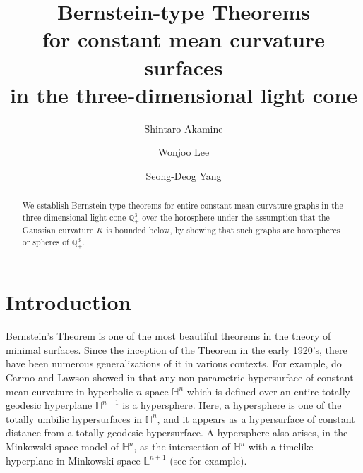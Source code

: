 \documentclass[12pt,reqno]{amsart}
\theoremstyle{plain} %
\theoremstyle{definition}
\numberwithin{equation}{section}
\newcommand{\qthreep}{\mathbb{Q}^3_+}
\begin{document}
\title[Bernstein-type Theorems for CMC surfaces in the light cone]{Bernstein-type Theorems \\ for constant mean curvature surfaces \\ in the three-dimensional light cone}
\author[S. Akamine]{Shintaro Akamine}
\address[Shintaro Akamine]{
	College of Bioresource Sciences,
	Nihon University,
	1866 Kameino, Fujisawa, Kanagawa, 252-0880, Japan}

\author[W. Lee]{Wonjoo Lee}
\address[Wonjoo Lee]{
	Department of Mathematics, Jeonbuk National University, Jeonju-si, Jeonbuk State 54896, Republic of Korea}

\author[S-D. Yang]{Seong-Deog Yang}
\address[Seong-Deog Yang]{
	Department of Mathematics, Korea University, Seoul 02841, Republic of Korea}

\begin{abstract}
	We establish Bernstein-type theorems for entire constant mean curvature graphs in the three-dimensional light cone $\qthreep$ over the horosphere under the assumption that the Gaussian curvature $K$ is bounded below, by showing that such graphs are horospheres or spheres of $\qthreep$.
\end{abstract}

\maketitle
\section{Introduction}\label{Sec.1}
Bernstein's Theorem is one of the most beautiful theorems in the theory of minimal surfaces. Since the inception of the Theorem in the early 1920's, there have been numerous generalizations of it in various contexts.
For example, do Carmo and Lawson showed in \cite{doCL} that any non-parametric hypersurface of constant mean curvature in hyperbolic $n$-space $\mathbb{H}^n$ which is defined over an entire totally geodesic hyperplane $\mathbb{H}^{n-1}$ is a hypersphere. Here, a hypersphere is one of the totally umbilic hypersurfaces in $\mathbb{H}^n$, and it appears as a hypersurface of constant distance from a totally geodesic hypersurface. A hypersphere also arises, in the Minkowski space model of $\mathbb{H}^n$, as the intersection of $\mathbb{H}^n$ with a timelike hyperplane in Minkowski space $\mathbb{L}^{n+1}$ (see \cite{Spivak} for example).
\end{document}
